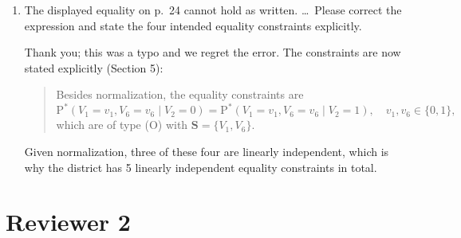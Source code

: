 \documentclass{article}
\def\Pdo{{\mathrm{P}^*}}
\newcommand{\bS}{\boldsymbol{S}}
\begin{document}
\begin{enumerate}
\begin{mdframed}
\begin{quote}
\begin{enumerate}
        \end{enumerate}
        \end{quote}
        Part (i) gives the corresponding result for equality constraints. In keeping with the reviewer's point, the criterion needs no vertex enumeration or optimization:
        \begin{quote}
        Both parts of Proposition 6 are exact and require no optimization. Part (i) needs only a few rank computations. Part (ii) needs only the incidence between facets and columns of $\boldsymbol{B}$: if $I$ is the 0/1 matrix with $I_{r\beta} = 1$ when column $\beta$ of $\boldsymbol{B}$ lies on the facet defined by row $r$ of $H_i$, then row $r$ is nontrivial if and only if every entry of row $r$ of $I \boldsymbol{B}^\top$ is positive.
        \end{quote}
        The software now implements this criterion. The tripartite Bell district takes 26 seconds (Table 1), where the listing of extreme points in the submitted version would have required $8^8 \approx 1.7\times 10^7$ of them.
    \end{mdframed}

    \item The displayed equality on p.~24 cannot hold as written. \ldots\, Please correct the expression and state the four intended equality constraints explicitly.
    \begin{mdframed}

Thank you; this was a typo and we regret the error. The constraints are now stated explicitly (Section 5):
\begin{quote}
Besides normalization, the equality constraints are
\[
\Pdo(V_1 = v_1, V_6 = v_6 \mid V_2 = 0) = \Pdo(V_1 = v_1, V_6 = v_6 \mid V_2 = 1), \quad v_1, v_6 \in \{0, 1\},
\]
which are of type (O) with $\bS = \{V_1, V_6\}$.
\end{quote}
Given normalization, three of these four are linearly independent, which is why the district has 5 linearly independent equality constraints in total.
    \end{mdframed}
\end{enumerate}


\section*{Reviewer 2}
\end{document}
